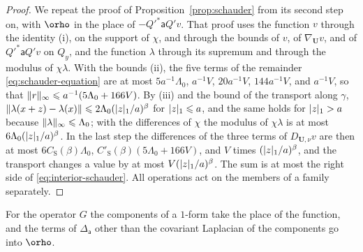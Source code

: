 \documentclass[11pt]{preprint}
\let\rho\orho
\DeclarePairedDelimiter{\abs}{\lvert}{\rvert}
\DeclarePairedDelimiter{\norm}{\lVert}{\rVert}
\numberwithin{equation}{section}
\begin{document}
\begin{proof}
We repeat the proof of Proposition~\ref{prop:schauder} from its second step on, with $\rho$ in the place of $-Q'^*\mathsf aQ'v$. That proof uses the function $v$ through the identity (i), on the support of $\chi$, and through the bounds of $v$, of $\nabla_{\mathbf U}v$, and of $Q'^*\mathsf aQ'v$ on $Q_y$, and the function $\lambda$ through its supremum and through the modulus of $\chi\lambda$. With the bounds (ii), the five terms of the remainder \eqref{eq:schauder-equation} are at most $5a^{-1}\Lambda_0$, $a^{-1}V$, $20a^{-1}V$, $144a^{-1}V$, and $a^{-1}V$, so that $\norm r_\infty \leqslant a^{-1}(5\Lambda_0 + 166V)$. By (iii) and the bound of the transport along $\gamma$, $\norm{\lambda(x + z) - \lambda(x)} \leqslant 2\Lambda_0(\abs z_1/a)^\beta$ for $\abs z_1 \leqslant a$, and the same holds for $\abs z_1 > a$ because $\norm\lambda_\infty \leqslant \Lambda_0$; with the differences of $\chi$ the modulus of $\chi\lambda$ is at most $6\Lambda_0(\abs z_1/a)^\beta$. In the last step the differences of the three terms of $D_{\mathbf U,\nu}v$ are then at most $6C_{\mathrm S}(\beta)\Lambda_0$, $C'_{\mathrm S}(\beta)(5\Lambda_0 + 166V)$, and $V$ times $(\abs z_1/a)^\beta$, and the transport changes a value by at most $V(\abs z_1/a)^\beta$. The sum is at most the right side of \eqref{eq:interior-schauder}. All operations act on the members of a family separately.
\end{proof}

For the operator $G$ the components of a $1$-form take the place of the function, and the terms of $\Delta_{\mathsf a}$ other than the covariant Laplacian of the components go into $\rho$.
\end{document}
